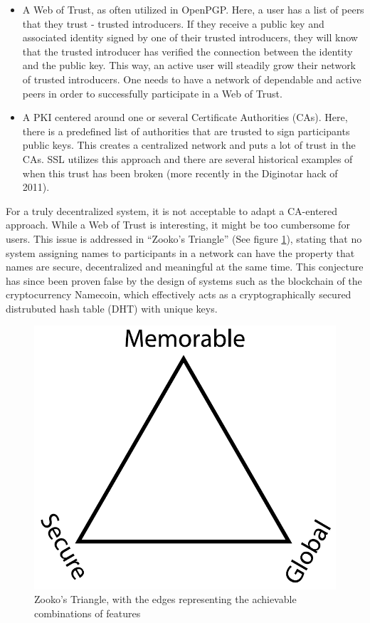 \begin{itemize}
\item A Web of Trust, as often utilized in OpenPGP. Here, a user has a list of peers that they trust - trusted introducers. If they receive a public key and associated identity signed by one of their trusted introducers, they will know that the trusted introducer has verified the connection between the identity and the public key. This way, an active user will steadily grow their network of trusted introducers. One needs to have a network of dependable and active peers in order to successfully participate in a Web of Trust.
\item A PKI centered around one or several Certificate Authorities (CAs). Here, there is a predefined list of authorities that are trusted to sign participants public keys. This creates a centralized network and puts a lot of trust in the CAs. SSL utilizes this approach and there are several historical examples of when this trust has been broken (more recently in the Diginotar hack of 2011).
\end{itemize}

For a truly decentralized system, it is not acceptable to adapt a CA-entered approach. While a Web of Trust is interesting, it might be too cumbersome for users. This issue is addressed in “Zooko’s Triangle” (See figure \ref{fig:zooko}), stating that no system assigning names to participants in a network can have the property that names are secure, decentralized and meaningful at the same time. This conjecture has since been proven false by the design of systems such as the blockchain of the cryptocurrency Namecoin, which effectively acts as a cryptographically secured distrubuted hash table (DHT) with unique keys.

\begin{figure}[h]
\centering
\includegraphics[width=\textwidth,height=0.2\paperheight,keepaspectratio
]{figures/Zooko_s_Triangle}
\caption{Zooko's Triangle, with the edges representing the achievable combinations of features \cite{Zooko:2001:Online}}
\label{fig:zooko}
\end{figure}

